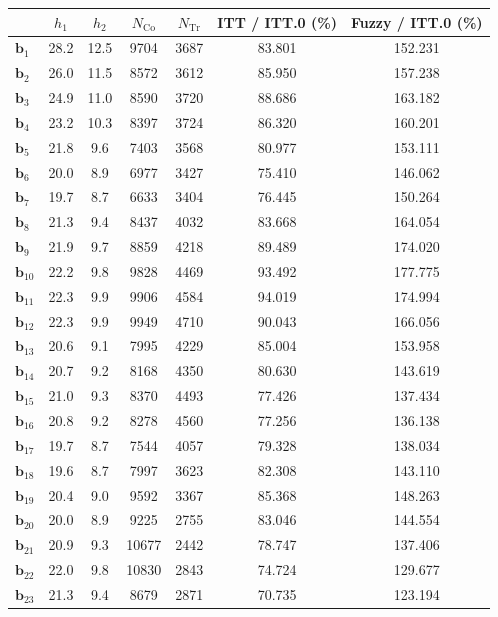 \documentclass[10pt]{article}
\newcommand{\bb}{\mathbf{b}}
\begin{document}
\begin{table}[p]
    \centering
\begin{tabular}{lcccccc}
  \toprule\toprule
   & $h_1$ & $h_2$ & $N_{\mathrm{Co}}$ & $N_{\mathrm{Tr}}$ & ITT / ITT.0 (\%) & Fuzzy / ITT.0 (\%) \\
  \midrule
   $\bb_{1}$ & 28.2 & 12.5 & 9704 & 3687 & 83.801 & 152.231\\
   $\bb_{2}$ & 26.0 & 11.5 & 8572 & 3612 & 85.950 & 157.238\\
   $\bb_{3}$ & 24.9 & 11.0 & 8590 & 3720 & 88.686 & 163.182\\
   $\bb_{4}$ & 23.2 & 10.3 & 8397 & 3724 & 86.320 & 160.201\\
   $\bb_{5}$ & 21.8 & 9.6 & 7403 & 3568 & 80.977 & 153.111\\
   $\bb_{6}$ & 20.0 & 8.9 & 6977 & 3427 & 75.410 & 146.062\\
   $\bb_{7}$ & 19.7 & 8.7 & 6633 & 3404 & 76.445 & 150.264\\
   $\bb_{8}$ & 21.3 & 9.4 & 8437 & 4032 & 83.668 & 164.054\\
   $\bb_{9}$ & 21.9 & 9.7 & 8859 & 4218 & 89.489 & 174.020\\
   $\bb_{10}$ & 22.2 & 9.8 & 9828 & 4469 & 93.492 & 177.775\\
   $\bb_{11}$ & 22.3 & 9.9 & 9906 & 4584 & 94.019 & 174.994\\
   $\bb_{12}$ & 22.3 & 9.9 & 9949 & 4710 & 90.043 & 166.056\\
   $\bb_{13}$ & 20.6 & 9.1 & 7995 & 4229 & 85.004 & 153.958\\
   $\bb_{14}$ & 20.7 & 9.2 & 8168 & 4350 & 80.630 & 143.619\\
   $\bb_{15}$ & 21.0 & 9.3 & 8370 & 4493 & 77.426 & 137.434\\
   $\bb_{16}$ & 20.8 & 9.2 & 8278 & 4560 & 77.256 & 136.138\\
   $\bb_{17}$ & 19.7 & 8.7 & 7544 & 4057 & 79.328 & 138.034\\
   $\bb_{18}$ & 19.6 & 8.7 & 7997 & 3623 & 82.308 & 143.110\\
   $\bb_{19}$ & 20.4 & 9.0 & 9592 & 3367 & 85.368 & 148.263\\
   $\bb_{20}$ & 20.0 & 8.9 & 9225 & 2755 & 83.046 & 144.554\\
   $\bb_{21}$ & 20.9 & 9.3 & 10677 & 2442 & 78.747 & 137.406\\
   $\bb_{22}$ & 22.0 & 9.8 & 10830 & 2843 & 74.724 & 129.677\\
   $\bb_{23}$ & 21.3 & 9.4 & 8679 & 2871 & 70.735 & 123.194\\

\end{tabular}
\end{table}
\end{document}
